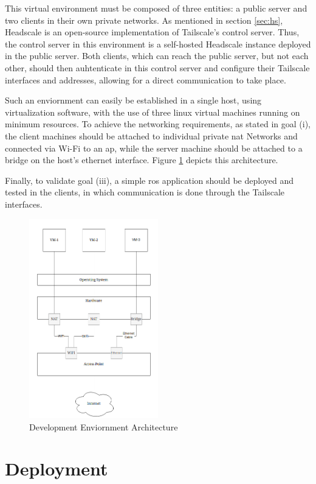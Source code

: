 \documentclass[11pt,twoside,a4paper]{report}
\begin{document}
This virtual environment must be composed of three entities: a public server and two clients in their own private networks. As mentioned in section \ref{sec:hs}, Headscale is an open-source implementation of Tailscale's control server. Thus, the control server in this environment is a self-hosted Headscale instance deployed in the public server. Both clients, which can reach the public server, but not each other, should then auhtenticate in this control server and configure their Tailscale interfaces and addresses, allowing for a direct communication to take place.

Such an enviornment can easily be established in a single host, using virtualization software, with the use of three linux virtual machines running on minimum resources. To achieve the networking requirements, as stated in goal (i), the client machines should be attached to individual private \ac{nat} Networks and connected via Wi-Fi to an \ac{ap}, while the server machine should be attached to a bridge on the host's ethernet interface. Figure \ref{fig:sandbox} depicts this architecture.

Finally, to validate goal (iii), a simple \ac{ros} application should be deployed and tested in the clients, in which communication is done through the Tailscale interfaces.

\begin{figure}[h]
\centering
\includegraphics[width=0.5\textwidth]{dev.png}
\caption{Development Enviornment Architecture}
\label{fig:sandbox}
\end{figure}


\section{Deployment}
\end{document}
